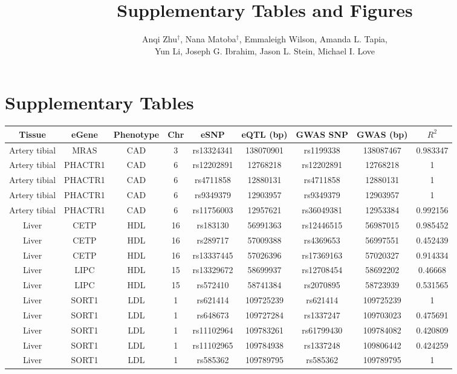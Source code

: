 \documentclass[11pt]{article}
\title{Supplementary Tables and Figures}
\author{Anqi Zhu$^\dagger$, Nana Matoba$^\dagger$, Emmaleigh Wilson, Amanda L. Tapia,
  \\ Yun Li, Joseph G. Ibrahim, Jason L. Stein, Michael I. Love}
\begin{document}
\maketitle

\section*{Supplementary Tables}

\begin{table}[!ht]
\centering
\footnotesize
\begin{tabular}{ccccccccc}
Tissue & eGene & Phenotype & Chr & eSNP & eQTL (bp) & GWAS SNP & GWAS (bp) & $R^2$ \\
\hline
Artery tibial  & MRAS & CAD & 3 & rs13324341 & 138070901 & rs1199338 & 138087467 & 0.983347 \\
Artery tibial  & PHACTR1 & CAD & 6 & rs12202891 & 12768218 & rs12202891 & 12768218 & 1 \\
Artery tibial  & PHACTR1 & CAD & 6 & rs4711858 & 12880131 & rs4711858 & 12880131 & 1 \\
Artery tibial  & PHACTR1 & CAD & 6 & rs9349379 & 12903957 & rs9349379 & 12903957 & 1 \\
Artery tibial  & PHACTR1 & CAD & 6 & rs11756003 & 12957621 & rs36049381 & 12953384 & 0.992156 \\
Liver & CETP & HDL & 16 & rs183130 & 56991363 & rs12446515 & 56987015 & 0.985452 \\ 
Liver & CETP & HDL & 16 & rs289717 & 57009388 & rs4369653 & 56997551 & 0.452439 \\ 
Liver & CETP & HDL & 16 & rs13337445 & 57026396 & rs17369163 & 57020327 & 0.914334 \\ 
Liver & LIPC & HDL & 15 & rs13329672 & 58699937 & rs12708454 & 58692202 & 0.46668 \\ 
Liver & LIPC & HDL & 15 & rs572410 & 58741384 & rs2070895 & 58723939 & 0.531565 \\ 
Liver & SORT1 & LDL & 1 & rs621414 & 109725239 & rs621414 & 109725239 & 1 \\ 
Liver & SORT1 & LDL & 1 & rs648673 & 109727284 & rs1337247 & 109703023 & 0.475691 \\ 
Liver & SORT1 & LDL & 1 & rs11102964 & 109783261 & rs61799430 & 109784082 & 0.420809 \\ 
Liver & SORT1 & LDL & 1 & rs11102965 & 109784938 & rs1337248 & 109806442 & 0.424259 \\ 
Liver & SORT1 & LDL & 1 & rs585362 & 109789795 & rs585362 & 109789795 & 1 \\ 

\end{tabular}
\end{table}
\end{document}
